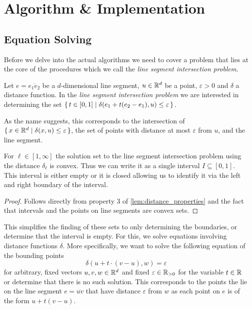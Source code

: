\section{Algorithm \& Implementation}
\label{sec:algorithm_implementation}

\subsection{Equation Solving}
\label{subsec:equation_solving}
Before we delve into the actual algorithms we need to cover a problem that lies at the core of the procedures which we call the \emph{line segment intersection problem}. 
\begin{definition}
  Let \(e = \overline{e_1e_2}\) be a \(d\)-dimensional line segment, \(u \in \mathbb{R}^d\) be a point, \(\varepsilon > 0\) and \(\delta\) a distance function. In the \emph{line segment intersection problem} we are interested in determining the set \(\set{t \in [0, 1] \mid \delta(e_1 + t(e_2 - e_1), u) \leq \varepsilon}\).

  As the name suggests, this corresponds to the intersection of \(\set{x \in \mathbb{R}^d \mid \delta(x, u) \leq \varepsilon}\), the set of points with distance at most \(\varepsilon\) from \(u\), and the line segment. 
\end{definition}

\begin{observation}
  For \(\ell \in [1, \infty]\) the solution set to the line segment intersection problem using the distance \(\delta_\ell\) is convex. Thus we can write it as a single interval \(I \subseteq [0, 1]\). This interval is either empty or it is closed allowing us to identify it via the left and right boundary of the interval. 
\end{observation}
\begin{proof}
  Follows directly from property 3 of \cref{lem:distance_properties} and the fact that intervals and the points on line segments are convex sets. 
\end{proof}

This simplifies the finding of these sets to only determining the boundaries, or determine that the interval is empty. For this, we solve equations involving distance functions \(\delta\). More specifically, we want to solve the following equation of the bounding points
\begin{equation}
  \delta(u + t \cdot (v - u), w) = \varepsilon \label{eq:eq_solve_main}
\end{equation}
for arbitrary, fixed vectors \(u, v, w \in \mathbb{R}^d\) and fixed \(\varepsilon \in \mathbb{R}_{>0}\) for the variable \(t \in \mathbb{R}\) or determine that there is no such solution. This corresponds to the points the lie on the line segment \(e = \overline{uv}\) that have distance \(\varepsilon\) from \(w\) as each point on \(e\) is of the form \(u + t(v-u)\). 

